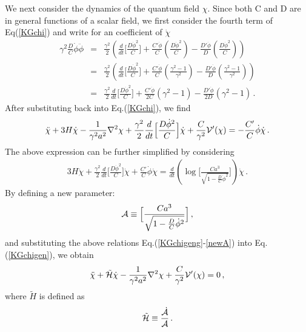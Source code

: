 \documentclass[aps,prd,amsmath,amssymb,preprintnumbers,onecolumn,11pt,nofootinbib]{revtex4}
\begin{document}
We next consider the dynamics of the quantum field $\chi$. Since both C and D are in general functions of a scalar field, we first consider the fourth term of Eq(\ref{KGchi}) and write for an coefficient of $\dot{\chi}$
\begin{eqnarray} \label{chigen}
\gamma^{2}\frac{D}{C}\dot{\phi}\ddot{\phi} &=& \frac{\gamma^{2}}{2}\left(\frac{d}{dt}\Big[\frac{D{\dot{\phi}}^{2}}{C}\Big] + \frac{C'\dot{\phi}}{C}\left(\frac{D{\dot{\phi}}^{2}}{C}\right) - \frac{D'\dot{\phi}}{D}\left(\frac{D{\dot{\phi}}^{2}}{C}\right)\right)\nonumber\\&=& \frac{\gamma^{2}}{2}\left(\frac{d}{dt}\Big[\frac{D{\dot{\phi}}^{2}}{C}\Big] + \frac{C'\dot{\phi}}{C}\left(\frac{\gamma^{2}-1}{\gamma^{2}}\right) - \frac{D'\dot{\phi}}{D}\left(\frac{\gamma^{2} -1}{\gamma^{2}}\right)\right)\nonumber\\&=&\frac{\gamma^{2}}{2}\frac{d}{dt}\Big[\frac{D{\dot{\phi}}^{2}}{C}\Big] + \frac{C'\dot{\phi}}{2C}\left(\gamma^{2}-1\right) -  \frac{D'\dot{\phi}}{2D}\left(\gamma^{2} -1\right)\,.
\end{eqnarray}
After substituting back into Eq.(\ref{KGchi}), we find
\begin{eqnarray} \label{KGchigen}
\ddot{\chi} +3H\dot{\chi} -\frac{1}{\gamma^{2}a^{2}}\nabla^{2}\chi
+ \frac{\gamma^{2}}{2}\frac{d}{dt}\Big[\frac{D{\dot{\phi}}^{2}}{C}\Big]\dot{\chi}+\frac{C}{\gamma^{2}}{\cal V}'(\chi) =  -\frac{C'}{C}\dot{\phi}\dot{\chi} \,.
\end{eqnarray}
The above expression can be further simplified by considering 
\begin{eqnarray} \label{KGchigeng}
3H\dot{\chi} + \frac{\gamma^{2}}{2}\frac{d}{dt}\Big[\frac{D{\dot{\phi}}^{2}}{C}\Big]\dot{\chi}+\frac{C'}{C}\dot{\phi}\dot{\chi} = \frac{d}{dt}\left(\log\Big[\frac{Ca^{3}}{\sqrt{1-\frac{D}{C}\dot{\phi}^{2}}}\Big]\right)\dot{\chi}\,.
\end{eqnarray}
By defining a new parameter:
\begin{eqnarray} \label{newA}
{\cal A}\equiv\Big[\frac{C a^{3}}{\sqrt{1-\frac{D}{C}\dot{\phi}^{2}}}\Big] \,,
\end{eqnarray}
and substituting the above relations Eq.(\ref{KGchigeng}-\ref{newA}) into Eq.(\ref{KGchigen}), we obtain
\begin{eqnarray} \label{KGchigen1}
\ddot{\chi} +{\tilde {\cal H}}\dot{\chi} -\frac{1}{\gamma^{2}a^{2}}\nabla^{2}\chi+\frac{C}{\gamma^{2}}{\cal V}'(\chi) =  0 \,,
\end{eqnarray}
where ${\tilde H}$ is defined as
\begin{eqnarray} \label{newH}
{\tilde {\cal H}}\equiv \frac{\dot{{\cal A}}}{{\cal A}}\,.
\end{eqnarray}
\end{document}
